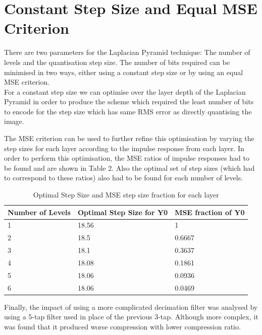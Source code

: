 \documentclass{article}					%
\begin{document}
\section{Constant Step Size and Equal MSE Criterion}
There are two parameters for the Laplacian Pyramid technique: The number of levels and the quantisation step size. The number of bits required can be minimised in two ways, either using a constant step size or by using an equal MSE criterion. \\

For a constant step size we can optimise over the layer depth of the Laplacian Pyramid in order to produce the scheme which required the least number of bits to encode for the step size which has same RMS error as directly quantising the image.

The MSE criterion can be used to further refine this optimisation by varying the step sizes for each layer according to the impulse response from each layer. In order to perform this optimisation, the MSE ratios of impulse responses had to be found and are shown in Table 2. Also the optimal set of step sizes (which had to correspond to these ratios) also had to be found for each number of levels.
\begin{table}[]
\begin{centering}
\begin{tabular}{|l|l|l|}
\hline
Number of Levels & Optimal Step Size for Y0 & MSE fraction of Y0 \\ \hline
1                & 18.56                    & 1                  \\ \hline
2                & 18.5                     & 0.6667             \\ \hline
3                & 18.1                     & 0.3637             \\ \hline
4                & 18.08                    & 0.1861             \\ \hline
5                & 18.06                    & 0.0936             \\ \hline
6                & 18.06                    & 0.0469             \\ \hline
\end{tabular}
\caption{Optimal Step Size and MSE step size fraction for each layer}
\end{centering}
\end{table}

Finally, the impact of using a more complicated decimation filter was analysed by using a 5-tap filter used in place of the previous 3-tap. Although more complex, it was found that it produced worse compression with lower compression ratio.
\end{document}
